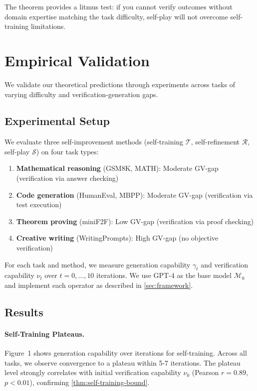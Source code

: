 \documentclass{article}
\theoremstyle{definition}
\theoremstyle{remark}
\newcommand{\M}{\mathcal{M}}  %
\newcommand{\T}{\mathcal{T}}  %
\begin{document}
The theorem provides a litmus test: if you cannot verify outcomes without domain expertise matching the task difficulty, self-play will not overcome self-training limitations.

\section{Empirical Validation}
\label{sec:experiments}

We validate our theoretical predictions through experiments across tasks of varying difficulty and verification-generation gaps.

\subsection{Experimental Setup}

We evaluate three self-improvement methods (self-training \(\T\), self-refinement \(\mathcal{R}\), self-play \(\mathcal{S}\)) on four task types:

\begin{enumerate}
\item \textbf{Mathematical reasoning} (GSM8K, MATH): Moderate GV-gap (verification via answer checking)
\item \textbf{Code generation} (HumanEval, MBPP): Moderate GV-gap (verification via test execution)
\item \textbf{Theorem proving} (miniF2F): Low GV-gap (verification via proof checking)
\item \textbf{Creative writing} (WritingPrompts): High GV-gap (no objective verification)
\end{enumerate}

For each task and method, we measure generation capability \(\gamma_t\) and verification capability \(\nu_t\) over \(t = 0, \ldots, 10\) iterations. We use GPT-4 as the base model \(\M_0\) and implement each operator as described in \cref{sec:framework}.

\subsection{Results}

\paragraph{Self-Training Plateaus.} Figure~1 shows generation capability over iterations for self-training. Across all tasks, we observe convergence to a plateau within 5-7 iterations. The plateau level strongly correlates with initial verification capability \(\nu_0\) (Pearson \(r = 0.89\), \(p < 0.01\)), confirming \cref{thm:self-training-bound}.
\end{document}
